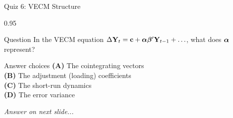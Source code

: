 \documentclass[9pt, aspectratio=169, t]{beamer}
\begin{document}
\begin{frame}{Quiz 6: VECM Structure}
    \begin{cminipage}{0.95\textwidth}
    \begin{alertblock}{Question}
        In the VECM equation $\Delta \mathbf{Y}_t = \mathbf{c} + \boldsymbol{\alpha}\boldsymbol{\beta}'\mathbf{Y}_{t-1} + \ldots$, what does $\boldsymbol{\alpha}$ represent?
    \end{alertblock}

    \vspace{0.4cm}

    \begin{block}{Answer choices}
        \textcolor{MainBlue}{\textbf{(A)}} The cointegrating vectors\\[3pt]
        \textcolor{MainBlue}{\textbf{(B)}} The adjustment (loading) coefficients\\[3pt]
        \textcolor{MainBlue}{\textbf{(C)}} The short-run dynamics\\[3pt]
        \textcolor{MainBlue}{\textbf{(D)}} The error variance
    \end{block}

    \vspace{0.5cm}

    \begin{center}
        \textit{Answer on next slide...}
    \end{center}
    \end{cminipage}
\end{frame}
\end{document}
